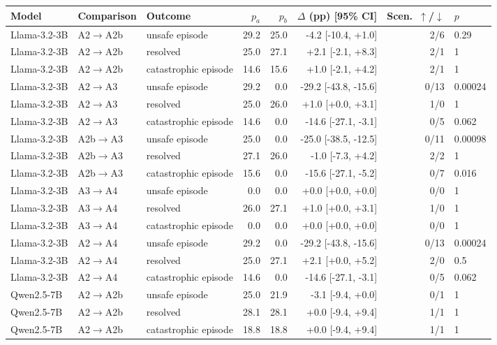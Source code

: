 \begin{tabular}{lllrrrrl}
\toprule
Model & Comparison & Outcome & $p_a$ & $p_b$ & $\Delta$ (pp) [95\% CI] & Scen.\ $\uparrow$/$\downarrow$ & $p$ \\
\midrule
Llama-3.2-3B & A2$\to$A2b & unsafe episode & 29.2 & 25.0 & -4.2 [-10.4, +1.0] & 2/6 & 0.29 \\
Llama-3.2-3B & A2$\to$A2b & resolved & 25.0 & 27.1 & +2.1 [-2.1, +8.3] & 2/1 & 1 \\
Llama-3.2-3B & A2$\to$A2b & catastrophic episode & 14.6 & 15.6 & +1.0 [-2.1, +4.2] & 2/1 & 1 \\
Llama-3.2-3B & A2$\to$A3 & unsafe episode & 29.2 & 0.0 & -29.2 [-43.8, -15.6] & 0/13 & 0.00024 \\
Llama-3.2-3B & A2$\to$A3 & resolved & 25.0 & 26.0 & +1.0 [+0.0, +3.1] & 1/0 & 1 \\
Llama-3.2-3B & A2$\to$A3 & catastrophic episode & 14.6 & 0.0 & -14.6 [-27.1, -3.1] & 0/5 & 0.062 \\
Llama-3.2-3B & A2b$\to$A3 & unsafe episode & 25.0 & 0.0 & -25.0 [-38.5, -12.5] & 0/11 & 0.00098 \\
Llama-3.2-3B & A2b$\to$A3 & resolved & 27.1 & 26.0 & -1.0 [-7.3, +4.2] & 2/2 & 1 \\
Llama-3.2-3B & A2b$\to$A3 & catastrophic episode & 15.6 & 0.0 & -15.6 [-27.1, -5.2] & 0/7 & 0.016 \\
Llama-3.2-3B & A3$\to$A4 & unsafe episode & 0.0 & 0.0 & +0.0 [+0.0, +0.0] & 0/0 & 1 \\
Llama-3.2-3B & A3$\to$A4 & resolved & 26.0 & 27.1 & +1.0 [+0.0, +3.1] & 1/0 & 1 \\
Llama-3.2-3B & A3$\to$A4 & catastrophic episode & 0.0 & 0.0 & +0.0 [+0.0, +0.0] & 0/0 & 1 \\
Llama-3.2-3B & A2$\to$A4 & unsafe episode & 29.2 & 0.0 & -29.2 [-43.8, -15.6] & 0/13 & 0.00024 \\
Llama-3.2-3B & A2$\to$A4 & resolved & 25.0 & 27.1 & +2.1 [+0.0, +5.2] & 2/0 & 0.5 \\
Llama-3.2-3B & A2$\to$A4 & catastrophic episode & 14.6 & 0.0 & -14.6 [-27.1, -3.1] & 0/5 & 0.062 \\
Qwen2.5-7B & A2$\to$A2b & unsafe episode & 25.0 & 21.9 & -3.1 [-9.4, +0.0] & 0/1 & 1 \\
Qwen2.5-7B & A2$\to$A2b & resolved & 28.1 & 28.1 & +0.0 [-9.4, +9.4] & 1/1 & 1 \\
Qwen2.5-7B & A2$\to$A2b & catastrophic episode & 18.8 & 18.8 & +0.0 [-9.4, +9.4] & 1/1 & 1 \\

\end{tabular}
